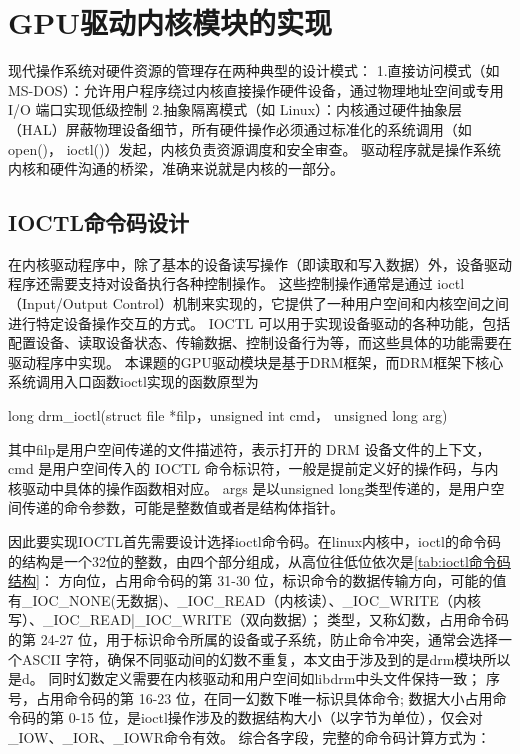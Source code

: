 
\section{GPU驱动内核模块的实现}
现代操作系统对硬件资源的管理存在两种典型的设计模式\cite{马超2015linux}：
1.直接访问模式​（如 MS-DOS）：允许用户程序绕过内核直接操作硬件设备，通过物理地址空间或专用 I/O 端口实现低级控制
2.抽象隔离模式​（如 Linux）：内核通过硬件抽象层（HAL）屏蔽物理设备细节，所有硬件操作必须通过标准化的系统调用（如 open()， ioctl()）发起，内核负责资源调度和安全审查。
驱动程序就是操作系统内核和硬件沟通的桥梁，准确来说就是内核的一部分。

\subsection{IOCTL命令码设计}
\label{sec:IOCTL命令码设计}
在内核驱动程序中，除了基本的设备读写操作（即读取和写入数据）外，设备驱动程序还需要支持对设备执行各种控制操作。
这些控制操作通常是通过 ioctl（Input/Output Control）机制来实现的，它提供了一种用户空间和内核空间之间进行特定设备操作交互的方式。
IOCTL 可以用于实现设备驱动的各种功能，包括配置设备、读取设备状态、传输数据、控制设备行为等，而这些具体的功能需要在驱动程序中实现。
本课题的GPU驱动模块是基于DRM框架，而DRM框架下核心系统调用入口函数ioctl实现的函数原型为

long drm\_ioctl(struct file *filp，unsigned int cmd， unsigned long arg)

其中filp是用户空间传递的文件描述符，表示打开的 DRM 设备文件的上下文，cmd 是用户空间传入的 IOCTL 命令标识符，一般是提前定义好的操作码，与内核驱动中具体的操作函数相对应。
args 是以unsigned long类型传递的，是用户空间传递的命令参数，可能是整数值或者是结构体指针。

因此要实现IOCTL首先需要设计选择ioctl命令码。在linux内核中，ioctl的命令码的结构是一个32位的整数，由四个部分组成，从高位往低位依次是\ref{tab:ioctl命令码结构}：
方向位，占用命令码的第 ​31-30 位​，标识命令的数据传输方向，可能的值有\_IOC\_NONE(无数据)、\_IOC\_READ（内核读）、\_IOC\_WRITE（内核写）、\_IOC\_READ|\_IOC\_WRITE（双向数据）；
类型，又称幻数，占用命令码的第 ​24-27 位，用于标识命令所属的设备或子系统，防止命令冲突，通常会选择一个ASCII 字符，确保不同驱动间的幻数不重复，本文由于涉及到的是drm模块所以是d。
同时幻数定义需要在内核驱动和用户空间如libdrm中头文件保持一致；
序号，占用命令码的第 ​16-23 位，在同一幻数下唯一标识具体命令;
数据大小占用命令码的第 ​0-15 位，是ioctl操作涉及的数据结构大小（以字节为单位），仅会对\_IOW、\_IOR、\_IOWR命令有效。
综合各字段，完整的命令码计算方式为：

